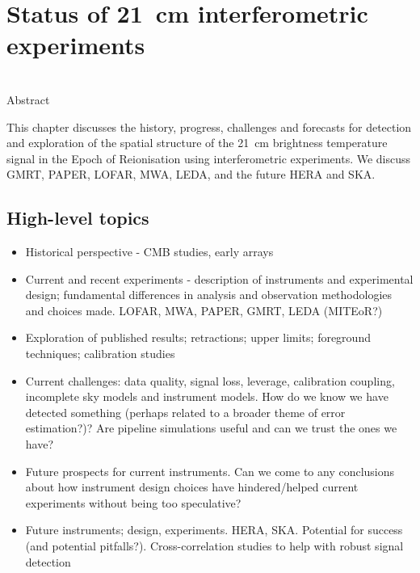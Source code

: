 \chapter{Status of 21~cm interferometric experiments}

\begin{bf}
  \author{Cathryn M. Trott (ICRAR-Curtin), Jonathan Pober (Brown University)}\\

Abstract\\
\end{bf}

This chapter discusses the history, progress, challenges and forecasts for detection and exploration of the spatial structure of the 21~cm brightness temperature signal in the Epoch of Reionisation using interferometric experiments. We discuss GMRT, PAPER, LOFAR, MWA, LEDA, and the future HERA and SKA.


\section{High-level topics}

\begin{itemize}
\item Historical perspective - CMB studies, early arrays
\item Current and recent experiments - description of instruments and experimental design; fundamental differences in analysis and observation methodologies and choices made. LOFAR, MWA, PAPER, GMRT, LEDA (MITEoR?)
\item Exploration of published results; retractions; upper limits; foreground techniques; calibration studies
\item Current challenges: data quality, signal loss, leverage, calibration coupling, incomplete sky models and instrument models. How do we know we have detected something (perhaps related to a broader theme of error estimation?)?  Are pipeline simulations useful and can we trust the ones we have?
\item Future prospects for current instruments. Can we come to any conclusions about how instrument design choices have hindered/helped current experiments without being too speculative?
\item Future instruments; design, experiments. HERA, SKA. Potential for success (and potential pitfalls?). Cross-correlation studies to help with robust signal detection
\end{itemize}



